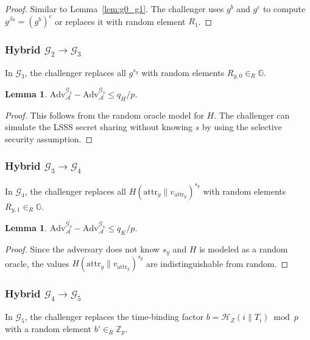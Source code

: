 \documentclass[lettersize,journal]{IEEEtran}
\newtheorem{lemma}[theorem]{Lemma}
\begin{document}
\begin{proof}
Similar to Lemma~\ref{lem:g0_g1}. The challenger uses $g^b$ and $g^c$ to compute $g^{\beta s} = (g^b)^c$ or replaces it with random element $R_1$.
\end{proof}

\subsubsection{Hybrid $\mathcal{G}_2 \rightarrow \mathcal{G}_3$}

In $\mathcal{G}_3$, the challenger replaces all $g^{s_y}$ with random elements $R_{y,0} \in_R \mathbb{G}$.

\begin{lemma}
\label{lem:g2_g3}
$\text{Adv}_{\mathcal{A}}^{\mathcal{G}_2} - \text{Adv}_{\mathcal{A}}^{\mathcal{G}_3} \leq q_H / p$.
\end{lemma}

\begin{proof}
This follows from the random oracle model for $H$. The challenger can simulate the LSSS secret sharing without knowing $s$ by using the selective security assumption.
\end{proof}

\subsubsection{Hybrid $\mathcal{G}_3 \rightarrow \mathcal{G}_4$}

In $\mathcal{G}_4$, the challenger replaces all $H(\mathrm{attr}_y \| v_{\mathrm{attr}_y})^{s_y}$ with random elements $R_{y,1} \in_R \mathbb{G}$.

\begin{lemma}
\label{lem:g3_g4}
$\text{Adv}_{\mathcal{A}}^{\mathcal{G}_3} - \text{Adv}_{\mathcal{A}}^{\mathcal{G}_4} \leq q_K / p$.
\end{lemma}

\begin{proof}
Since the adversary does not know $s_y$ and $H$ is modeled as a random oracle, the values $H(\mathrm{attr}_y \| v_{\mathrm{attr}_y})^{s_y}$ are indistinguishable from random.
\end{proof}

\subsubsection{Hybrid $\mathcal{G}_4 \rightarrow \mathcal{G}_5$}

In $\mathcal{G}_5$, the challenger replaces the time-binding factor $b = \mathcal{H}_Z(i \| T_i) \bmod p$ with a random element $b' \in_R \mathbb{Z}_p$.
\end{document}
